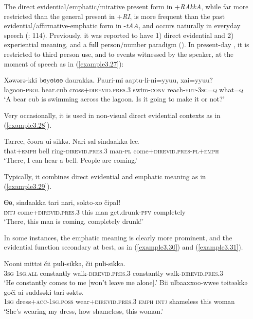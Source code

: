 \documentclass[output=paper,colorlinks,citecolor=brown]{langscibook}
\begin{document}
The direct evidential/emphatic/mirative present form in +\textit{RAkkA}, while far more restricted than the general present in +\textit{RI}, is more frequent than the past evidential/affirmative-emphatic form in -\textit{tAA}, and occurs naturally in everyday speech (\citealt{Yamada_2013}: 114). Previously, it was reported to have 1) direct evidential and 2) experiential meaning, and a full person/number paradigm (\citealt{Ikegami_1959}). In present-day , it is restricted to third person use, and to events witnessed by the speaker, at the moment of speech as in (\ref{example3.27}):

\ea
\label{example3.27}
\gll Xəwərə-kki	bɵyɵtɵɵ	daurakka.			Pauri-mi		aaptu-li-ni=yyuu,	xai=yyuu?\\
     	lagoon-\textsc{prol}	bear.cub	cross+\textsc{direvid}.\textsc{pres}.\textsc{3}	swim-\textsc{conv}	reach-\textsc{fut}-\textsc{3sg}=\textsc{q}	what=\textsc{q}\\
\glt `A bear cub is swimming across the lagoon. Is it going to make it or not?’
\z

Very occasionally, it is used in non-visual direct evidential contexts as in (\ref{example3.28}).

\ea
\label{example3.28}
\gll Tarree,		čoora	ui-sikkə.				Nari-sal	sindaakka-lee.\\
     	that+\textsc{emph}	bell		ring-\textsc{direvid}.\textsc{pres}.\textsc{3}	man-\textsc{pl}	come+\textsc{direvid}.\textsc{pres}-\textsc{pl}+\textsc{emph}\\
\glt `There, I can hear a bell. People are coming.’
\z

Typically, it combines direct evidential and emphatic meaning as in (\ref{example3.29}).

\ea
\label{example3.29}
\gll Ɵɵ,	sindaakka			tari	nari,	sokto-xo			čipal!\\
     	\textsc{intj}	come+\textsc{direvid}.\textsc{pres}.\textsc{3}	this	man		get.drunk-\textsc{pfv}		completely\\
\glt `There, this man is coming, completely drunk!’
\z

In some instances, the emphatic meaning is clearly more prominent, and the evidential function secondary at best, as in (\ref{example3.30}) and (\ref{example3.31}).

\ea
\label{example3.30}
\gll Nooni	mittəi	čii			puli-sikkə,			čii			puli-sikkə.\\
     	\textsc{3sg}		\textsc{1sg}.\textsc{all}	constantly	walk-\textsc{direvid}.\textsc{pres}.\textsc{3}	constantly	walk-\textsc{direvid}.\textsc{pres}.\textsc{3}\\
\glt `He constantly comes to me [won’t leave me alone].’
\ex
\label{example3.31}
\gll Bii	ulbaaxxoo-wwee		təitəəkkə				goči		ai	suddəəki		tari	əəktə.\\
     \textsc{1sg}	dress+\textsc{acc}-\textsc{1sg}.\textsc{poss}	wear+\textsc{direvid}.\textsc{pres}.\textsc{3}	\textsc{emph}	\textsc{intj}	shameless	this	woman\\
\glt `She’s wearing my dress, how shameless, this woman.’
\z
\end{document}
